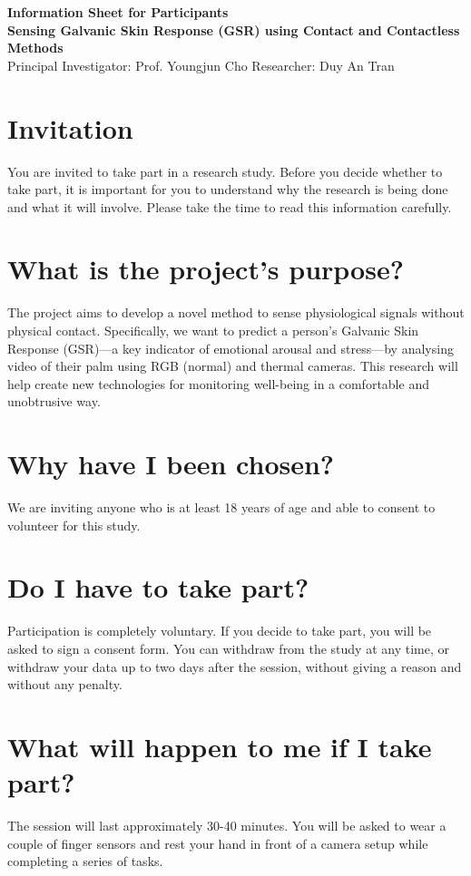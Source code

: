 \documentclass[12pt]{article}
\begin{document}
\begin{center}
  {\Large\bfseries Information Sheet for Participants}\\[2ex]
  {\bfseries Sensing Galvanic Skin Response (GSR) using Contact and Contactless Methods}\\[1ex]
  {\small Principal Investigator: Prof. Youngjun Cho \quad \quad Researcher: Duy An Tran}
\end{center}

\bigskip
\bigskip

\section{Invitation}
You are invited to take part in a research study. Before you decide whether to take part, it is important for you to understand why the research is being done and what it will involve. Please take the time to read this information carefully.

\section{What is the project's purpose?}
The project aims to develop a novel method to sense physiological signals without physical contact. Specifically, we want to predict a person's Galvanic Skin Response (GSR)—a key indicator of emotional arousal and stress—by analysing video of their palm using RGB (normal) and thermal cameras. This research will help create new technologies for monitoring well-being in a comfortable and unobtrusive way.

\section{Why have I been chosen?}
We are inviting anyone who is at least 18 years of age and able to consent to volunteer for this study.

\section{Do I have to take part?}
Participation is completely voluntary. If you decide to take part, you will be asked to sign a consent form. You can withdraw from the study at any time, or withdraw your data up to two days after the session, without giving a reason and without any penalty.

\section{What will happen to me if I take part?}
The session will last approximately 30-40 minutes. You will be asked to wear a couple of finger sensors and rest your hand in front of a camera setup while completing a series of tasks.
\end{document}
